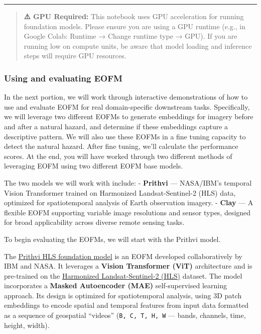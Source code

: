 \documentclass[
  letterpaper,
  DIV=11,
  numbers=noendperiod]{scrreprt}
\begin{document}
\begin{center}\rule{0.5\linewidth}{0.5pt}\end{center}

\begin{quote}
\textbf{⚠️ GPU Required:} This notebook uses GPU acceleration for
running foundation models. Please ensure you are using a GPU runtime
(e.g., in Google Colab: Runtime → Change runtime type → GPU). If you are
running low on compute units, be aware that model loading and inference
steps will require GPU resources.
\end{quote}

\subsubsection{Using and evaluating
EOFM}\label{using-and-evaluating-eofm}

In the next portion, we will work through interactive demonstrations of
how to use and evaluate EOFM for real domain-specific downstream tasks.
Specifically, we will leverage two different EOFMs to generate
embeddings for imagery before and after a natural hazard, and determine
if these embeddings capture a descriptive pattern. We will also use
these EOFMs in a fine tuning capacity to detect the natural hazard.
After fine tuning, we'll calculate the performance scores. At the end,
you will have worked through two different methods of leveraging EOFM
using two different EOFM base models.

The two models we will work with include: - \textbf{Prithvi} ---
NASA/IBM's temporal Vision Transformer trained on Harmonized
Landsat-Sentinel-2 (HLS) data, optimized for spatiotemporal analysis of
Earth observation imagery. - \textbf{Clay} --- A flexible EOFM
supporting variable image resolutions and sensor types, designed for
broad applicability across diverse remote sensing tasks.

To begin evaluating the EOFMs, we will start with the Prithvi model.

The \href{https://github.com/NASA-IMPACT/Prithvi-EO-2.0}{Prithvi HLS
foundation model} is an EOFM developed collaboratively by IBM and NASA.
It leverages a \textbf{Vision Transformer (ViT)} architecture and is
pre-trained on the \href{https://hls.gsfc.nasa.gov/}{Harmonized
Landsat-Sentinel-2 (HLS)} dataset. The model incorporates a
\textbf{Masked Autoencoder (MAE)} self-supervised learning approach. Its
design is optimized for spatiotemporal analysis, using 3D patch
embeddings to encode spatial and temporal features from input data
formatted as a sequence of geospatial ``videos''
(\texttt{B,\ C,\ T,\ H,\ W} --- bands, channels, time, height, width).
\end{document}
